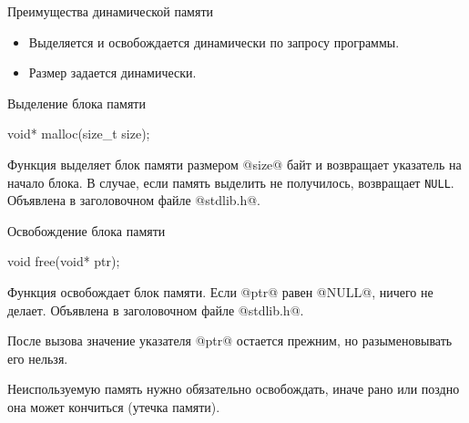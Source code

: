 \begin{frame}[fragile]{Преимущества динамической памяти}

  \begin{itemize}[<+->]
    \item Выделяется и освобождается динамически по запросу программы.
    \item Размер задается динамически.
  \end{itemize}



\end{frame}

\begin{frame}[fragile]{Выделение блока памяти}

  \begin{clisting}[basicstyle=\ttfamily]
    void* malloc(size_t size);
  \end{clisting}
  \revertListingParskip
  Функция выделяет блок памяти размером @size@ байт и возвращает указатель на
  начало блока. \alert<2>{В случае, если память выделить не получилось,
  возвращает \texttt{NULL}.}
  Объявлена в заголовочном файле @stdlib.h@.


\end{frame}

\begin{frame}[fragile]{Освобождение блока памяти}

  \begin{clisting}[basicstyle=\ttfamily]
    void free(void* ptr);
  \end{clisting}

  Функция освобождает блок памяти. Если @ptr@ равен @NULL@, ничего не делает.
  Объявлена в заголовочном файле @stdlib.h@.

  \pause
  После вызова значение указателя @ptr@ остается прежним, но разыменовывать его
  нельзя.

  \pause
  Неиспользуемую память нужно обязательно освобождать, иначе рано или поздно
  она может кончиться (утечка памяти).



\end{frame}

